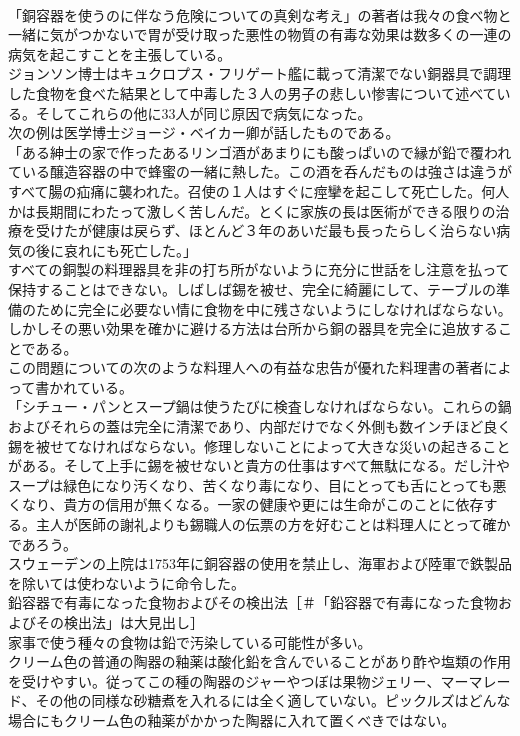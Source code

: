 \documentclass[8pt]{extreport}
\begin{document}
\begin{CJK}{UTF8}{min}
\\	「銅容器を使うのに伴なう危険についての真剣な考え」の著者は我々の食べ物と一緒に気がつかないで胃が受け取った悪性の物質の有毒な効果は数多くの一連の病気を起こすことを主張している。
\\	ジョンソン博士はキュクロプス・フリゲート艦に載って清潔でない銅器具で調理した食物を食べた結果として中毒した３人の男子の悲しい惨害について述べている。そしてこれらの他に33人が同じ原因で病気になった。
\\	次の例は医学博士ジョージ・ベイカー卿が話したものである。
\\	「ある紳士の家で作ったあるリンゴ酒があまりにも酸っぱいので縁が鉛で覆われている醸造容器の中で蜂蜜の一緒に熱した。この酒を呑んだものは強さは違うがすべて腸の疝痛に襲われた。召使の１人はすぐに痙攣を起こして死亡した。何人かは長期間にわたって激しく苦しんだ。とくに家族の長は医術ができる限りの治療を受けたが健康は戻らず、ほとんど３年のあいだ最も長ったらしく治らない病気の後に哀れにも死亡した。」
\\	すべての銅製の料理器具を非の打ち所がないように充分に世話をし注意を払って保持することはできない。しばしば錫を被せ、完全に綺麗にして、テーブルの準備のために完全に必要ない情に食物を中に残さないようにしなければならない。しかしその悪い効果を確かに避ける方法は台所から銅の器具を完全に追放することである。
\\	この問題についての次のような料理人への有益な忠告が優れた料理書の著者によって書かれている。
\\	「シチュー・パンとスープ鍋は使うたびに検査しなければならない。これらの鍋およびそれらの蓋は完全に清潔であり、内部だけでなく外側も数インチほど良く錫を被せてなければならない。修理しないことによって大きな災いの起きることがある。そして上手に錫を被せないと貴方の仕事はすべて無駄になる。だし汁やスープは緑色になり汚くなり、苦くなり毒になり、目にとっても舌にとっても悪くなり、貴方の信用が無くなる。一家の健康や更には生命がこのことに依存する。主人が医師の謝礼よりも錫職人の伝票の方を好むことは料理人にとって確かであろう。
\\	スウェーデンの上院は1753年に銅容器の使用を禁止し、海軍および陸軍で鉄製品を除いては使わないように命令した。
\\	鉛容器で有毒になった食物およびその検出法［＃「鉛容器で有毒になった食物およびその検出法」は大見出し］
\\	家事で使う種々の食物は鉛で汚染している可能性が多い。
\\	クリーム色の普通の陶器の釉薬は酸化鉛を含んでいることがあり酢や塩類の作用を受けやすい。従ってこの種の陶器のジャーやつぼは果物ジェリー、マーマレード、その他の同様な砂糖煮を入れるには全く適していない。ピックルズはどんな場合にもクリーム色の釉薬がかかった陶器に入れて置くべきではない。

\end{CJK}
\end{document}
